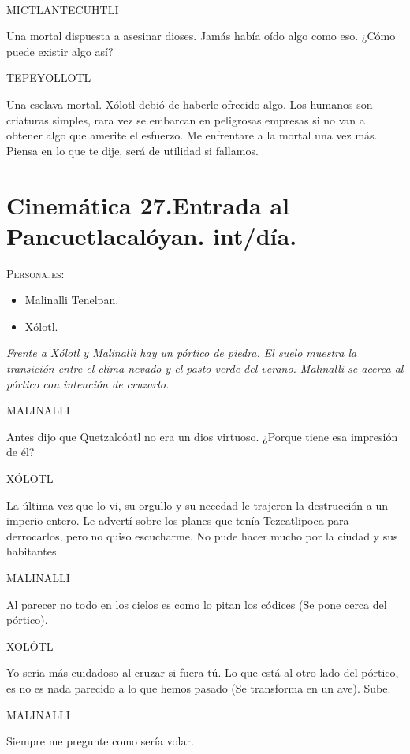 \documentclass[11pt,letterpaper]{article}
\begin{document}
\begin{center}
\\
\par
MICTLANTECUHTLI
\\
\par
Una mortal dispuesta a asesinar dioses. Jamás había oído algo como eso. ¿Cómo puede existir algo así?
\\
\par
 TEPEYOLLOTL
\\
\par
Una esclava mortal. Xólotl debió de haberle ofrecido algo. Los humanos son criaturas simples, rara vez se embarcan en peligrosas empresas si no van a obtener algo que amerite el esfuerzo. Me enfrentare a la mortal una vez más. Piensa en lo que te dije, será de utilidad si fallamos.
\end{center}

\section{Cinemática 27.Entrada al Pancuetlacalóyan. int/día.}
 \textsc{Personajes}:
 \begin{itemize}
 \item Malinalli Tenelpan.
\item Xólotl.
 \end{itemize}
\textit{Frente a Xólotl y Malinalli hay un pórtico de piedra. El suelo muestra la transición entre el clima nevado y el pasto verde del verano. Malinalli se acerca al pórtico con intención de cruzarlo.}
\begin{center}
MALINALLI
\\
\par
Antes dijo que Quetzalcóatl no era un dios virtuoso. ¿Porque tiene esa impresión de él?
\\
\par
XÓLOTL
\\
\par
La última vez que lo vi, su orgullo y su necedad le trajeron la destrucción a un imperio entero. Le advertí sobre los planes que tenía Tezcatlipoca para derrocarlos, pero no quiso escucharme. No pude hacer mucho por la ciudad y sus habitantes.
\\
\par
MALINALLI
\\
\par
Al parecer no todo en los cielos es como lo pitan los códices (Se pone cerca del pórtico).
\\
\par
XOLÓTL
\\
\par
Yo sería más cuidadoso al cruzar si fuera tú. Lo que está al otro lado del pórtico, es no es nada parecido a lo que hemos pasado (Se transforma en un ave). Sube.
\\
\par
MALINALLI
\\
\par
Siempre me pregunte como sería volar.
\end{center}
\end{document}
